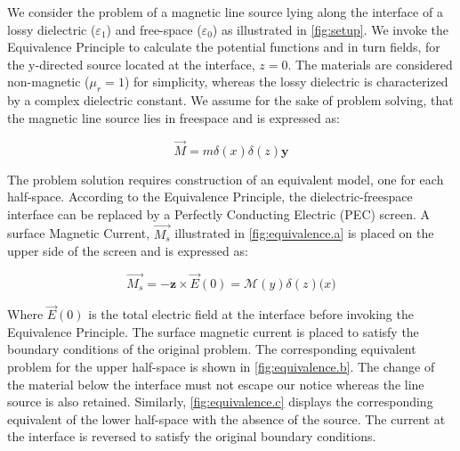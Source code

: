 \documentclass{article}
\begin{document}
  We consider the problem of a magnetic line source lying along the interface of a lossy dielectric ($\varepsilon_1$) and free-space ($\varepsilon_0$) as illustrated in \ref{fig:setup}. We invoke the Equivalence Principle to calculate the potential functions and in turn fields, for the y-directed source located at the interface, $z = 0$. The materials are considered non-magnetic ($\mu_r = 1$) for simplicity, whereas the lossy dielectric is characterized by a complex dielectric constant. We assume for the sake of problem solving, that the magnetic line source lies in freespace and is expressed as:

  \begin{equation}
    \overrightarrow{M} = m \delta(x) \delta(z) \mathbf{y}
    \label{Current}
  \end{equation}

  The problem solution requires construction of an equivalent model, one for each half-space. According to the Equivalence Principle, the dielectric-freespace interface can be replaced by a Perfectly Conducting Electric (PEC) screen. A surface Magnetic Current, $\overrightarrow{M_s}$ illustrated in \ref{fig:equivalence.a} is placed on the upper side of the screen and is expressed as:

  \begin{equation}
    \overrightarrow{M_s} = - \mathbf{z} \times \overrightarrow{E}(0) = \mathcal{M}(y) \delta (z) \mathbf(x)
    \end{equation}

    Where $\overrightarrow{E}(0)$ is the total electric field at the interface before invoking the Equivalence Principle. The surface magnetic current is placed to satisfy the boundary conditions of the original problem. The corresponding equivalent problem for the upper half-space is shown in \ref{fig:equivalence.b}. The change of the material below the interface must not escape our notice whereas the line source is also retained. Similarly,
    \ref{fig:equivalence.c} displays the corresponding equivalent of the lower half-space with the absence of the source. The current at the interface is reversed to satisfy the original boundary conditions.
  
\end{document}
